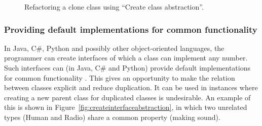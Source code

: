 \begin{figure}[H]
\begin{parcolumns}{2}
\end{parcolumns}
\caption{Refactoring a clone class using ``Create class abstraction''.}
\label{fig:createclassabstraction}
\end{figure}

\subsubsection{Providing default implementations for common functionality}
In Java, C\#, Python and possibly other object-oriented languages, the programmer can create interfaces of which a class can implement any number. Such interfaces can (in Java, C\# and Python) provide default implementations for common functionality \cite{mohnen2002interfaces}. This gives an opportunity to make the relation between classes explicit and reduce duplication. It can be used in instances where creating a new parent class for duplicated classes is undesirable. An example of this is shown in Figure~\ref{fig:createinterfaceabstraction}, in which two unrelated types (Human and Radio) share a common property (making sound).

